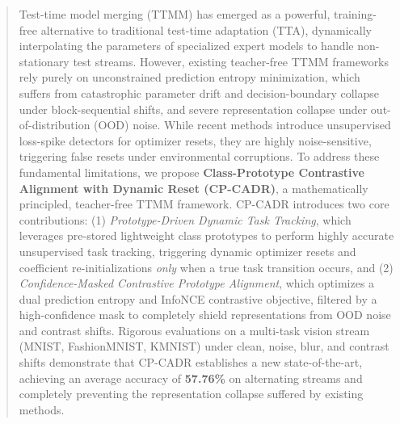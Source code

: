 \documentclass{article}
\theoremstyle{plain}
\theoremstyle{definition}
\theoremstyle{remark}
\begin{document}

\printAffiliationsAndNotice{}

\begin{abstract}
Test-time model merging (TTMM) has emerged as a powerful, training-free alternative to traditional test-time adaptation (TTA), dynamically interpolating the parameters of specialized expert models to handle non-stationary test streams. However, existing teacher-free TTMM frameworks rely purely on unconstrained prediction entropy minimization, which suffers from catastrophic parameter drift and decision-boundary collapse under block-sequential shifts, and severe representation collapse under out-of-distribution (OOD) noise. While recent methods introduce unsupervised loss-spike detectors for optimizer resets, they are highly noise-sensitive, triggering false resets under environmental corruptions. To address these fundamental limitations, we propose \textbf{Class-Prototype Contrastive Alignment with Dynamic Reset (CP-CADR)}, a mathematically principled, teacher-free TTMM framework. CP-CADR introduces two core contributions: (1) \emph{Prototype-Driven Dynamic Task Tracking}, which leverages pre-stored lightweight class prototypes to perform highly accurate unsupervised task tracking, triggering dynamic optimizer resets and coefficient re-initializations \emph{only} when a true task transition occurs, and (2) \emph{Confidence-Masked Contrastive Prototype Alignment}, which optimizes a dual prediction entropy and InfoNCE contrastive objective, filtered by a high-confidence mask to completely shield representations from OOD noise and contrast shifts. Rigorous evaluations on a multi-task vision stream (MNIST, FashionMNIST, KMNIST) under clean, noise, blur, and contrast shifts demonstrate that CP-CADR establishes a new state-of-the-art, achieving an average accuracy of \textbf{57.76\%} on alternating streams and completely preventing the representation collapse suffered by existing methods.
\end{abstract}
\end{document}

